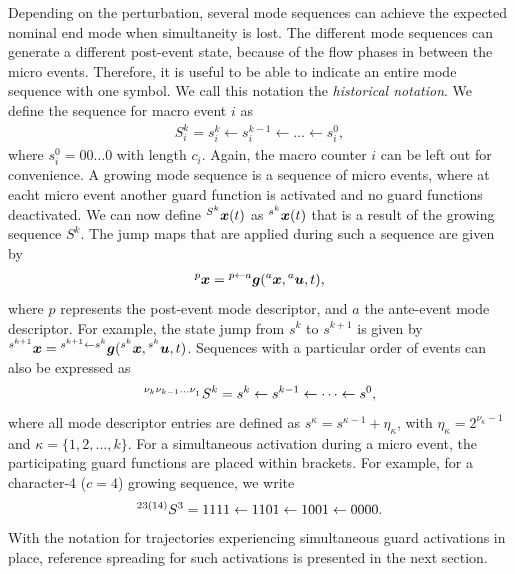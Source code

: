 \documentclass[../DC2019003Bouma.tex]{subfiles}
\begin{document}
Depending on the perturbation, several mode sequences can achieve the expected nominal end mode when simultaneity is lost. The different mode sequences can generate a different post-event state, because of the flow phases in between the micro events. Therefore, it is useful to be able to indicate an entire mode sequence with one symbol. We call this notation the \textit{historical notation}. We define the sequence for macro event $i$ as 
\begin{align}
S^k_i = s^k_i\leftarrow s^{k-1}_i\leftarrow \dots \leftarrow s^0_i,
\end{align}
where $s^0_i = 00\dots0$ with length $c_i$. Again, the macro counter $i$ can be left out for convenience. A growing mode sequence is a sequence of micro events, where at eacht micro event another guard function is activated and no guard functions deactivated. We can now define $\hspace{0cm}^{S^k}{\boldsymbol{x}}(t)$ as $\hspace{0cm}^{s^k}{\boldsymbol{x}}(t)$ that is a result of the growing sequence $S^k$. The jump maps that are applied during such a sequence are given by
\begin{align}
\hspace{0cm}^{p}{\boldsymbol{x}} = \hspace{0cm}^{p\leftarrow a}{\boldsymbol{g}}(\hspace{0cm}^{a}{\boldsymbol{x}},\hspace{0cm}^{a}{\boldsymbol{u}},t),
\end{align}
where $p$ represents the post-event mode descriptor, and $a$ the ante-event mode descriptor. For example, the state jump from $s^k$ to $s^{k+1}$ is given by $\hspace{0cm}^{s^{k+1}}{\boldsymbol{x}} = \hspace{0cm}^{s^{k+1}\leftarrow s^k}{\boldsymbol{g}}(\hspace{0cm}^{s^k}{\boldsymbol{x}},\hspace{0cm}^{s^k}{\boldsymbol{u}},t)$. Sequences with a particular order of events can also be expressed as
\begin{align}
\hspace{0cm}^{\nu_k \nu_{k-1}\dots\nu_{\hspace{0cm}_{1}}}S^k = s^k \leftarrow s^{k-1} \leftarrow \dots \leftarrow s^0,
\end{align}
where all mode descriptor entries are defined as $s^{\kappa} = s^{\kappa-1} + \eta_{\kappa}$, with $\eta_{\kappa} = 2^{\nu_{\kappa}-1}$ and $\kappa = \{1,2,\dots,k\}$. For a simultaneous activation during a micro event, the participating guard functions are placed within brackets. For example, for a character-4 ($c = 4$) growing sequence, we write 
\begin{align}
\hspace{0cm}^{23(14)}S^3 = 1111 \leftarrow 1101 \leftarrow 1001 \leftarrow 0000.
\end{align}
%
With the notation for trajectories experiencing simultaneous guard activations in place, reference spreading for such activations is presented in the next section.
\end{document}
